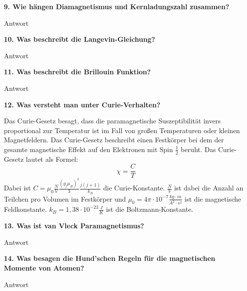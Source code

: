 \noindent\textbf{9. Wie hängen Diamagnetismus und Kernladungszahl zusammen?}\\
\begin{addmargin}[25pt]{0pt}
Antwort\\
\end{addmargin}

\noindent\textbf{10. Was beschreibt die Langevin-Gleichung?}\\
\begin{addmargin}[25pt]{0pt}
Antwort\\
\end{addmargin}

\noindent\textbf{11. Was beschreibt die Brillouin Funktion?}\\
\begin{addmargin}[25pt]{0pt}
Antwort\\
\end{addmargin}

\noindent\textbf{12. Was versteht man unter Curie-Verhalten?}\\
\begin{addmargin}[25pt]{0pt}
Das Curie-Gesetz besagt, dass die paramagnetische Suszeptibilität invers proportional zur Temperatur ist im Fall von großen Temperaturen oder kleinen Magnetfeldern. Das Curie-Gesetz beschreibt einen Festkörper bei dem der gesamte magnetische Effekt auf den Elektronen mit Spin $\frac{1}{2}$ beruht. Das Curie-Gesetz lautet als Formel:
\begin{equation}\label{eq:Curie-Gesetz}
    \chi = \frac{C}{T}
\end{equation}
Dabei ist $C = \mu_0\frac{N}{V}\frac{(g_j\mu_B)^2}{3}\frac{j(j+1)}{k_B}$ die Curie-Konstante. $\frac{N}{V}$ ist dabei die Anzahl an Teilchen pro Volumen im Festkörper und $\mu_0 = 4\pi\cdot 10^{-7} \frac{\si{kg}\cdot \si{m}}{\si{A}^2\cdot \si{s}^2}$ ist die magnetische Feldkonstante. $k_B = 1,38\cdot 10^{-23} \frac{\si{J}}{\si{K}}$ ist die Boltzmann-Konstante.\\
\end{addmargin}

\noindent\textbf{13. Was ist van Vleck Paramagnetismus?}\\
\begin{addmargin}[25pt]{0pt}
Antwort\\
\end{addmargin}

\noindent\textbf{14. Was besagen die Hund'schen Regeln für die magnetischen Momente von Atomen?}\\
\begin{addmargin}[25pt]{0pt}
Antwort\\
\end{addmargin}

